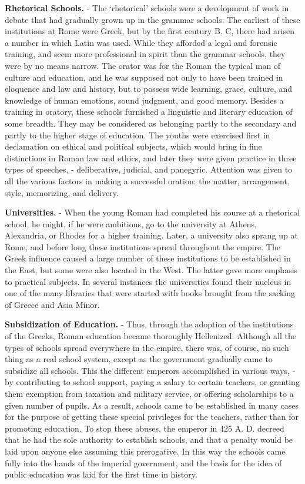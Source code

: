 \documentclass[]{book}
\begin{document}
\textbf{Rhetorical Schools.} - The `rhetorical' schools were a development of work in debate that had gradually grown up in the grammar schools. The earliest of these institutions at Rome were Greek, but by the first century B. C, there had arisen a number in which Latin was used. While they afforded a legal and forensic training, and seem more professional in spirit than the grammar schools, they were by no means narrow. The orator was for the Roman the typical man of culture and education, and he was supposed not only to have been trained in eloquence and law and history, but to possess wide learning, grace, culture, and knowledge of human emotions, sound judgment, and good memory. Besides a training in oratory, these schools furnished a linguistic and literary education of some breadth. They may be considered as belonging partly to the secondary and partly to the higher stage of education. The youths were exercised first in declamation on ethical and political subjects, which would bring in fine distinctions in Roman law and ethics, and later they were given practice in three types of speeches, - deliberative, judicial, and panegyric. Attention was given to all the various factors in making a successful oration: the matter, arrangement, style, memorizing, and delivery.

\textbf{Universities.} - When the young Roman had completed his course at a rhetorical school, he might, if he were ambitious, go to the university at Athens, Alexandria, or Rhodes for a higher training. Later, a university also sprang up at Rome, and before long these institutions spread throughout the empire. The Greek influence caused a large number of these institutions to be established in the East, but some were also located in the West. The latter gave more emphasis to practical subjects. In several instances the universities found their nucleus in one of the many libraries that were started with books brought from the sacking of Greece and Asia Minor.

\textbf{Subsidization of Education.} - Thus, through the adoption of the institutions of the Greeks, Roman education became thoroughly Hellenized. Although all the types of schools spread everywhere in the empire, there was, of course, no such thing as a real school system, except as the government gradually came to subsidize all schools. This the different emperors accomplished in various ways, - by contributing to school support, paying a salary to certain teachers, or granting them exemption from taxation and military service, or offering scholarships to a given number of pupils. As a result, schools came to be established in many cases for the purpose of getting these special privileges for the teachers, rather than for promoting education. To stop these abuses, the emperor in 425 A. D. decreed that he had the sole authority to establish schools, and that a penalty would be laid upon anyone else assuming this prerogative. In this way the schools came fully into the hands of the imperial government, and the basis for the idea of public education was laid for the first time in history.
\end{document}
